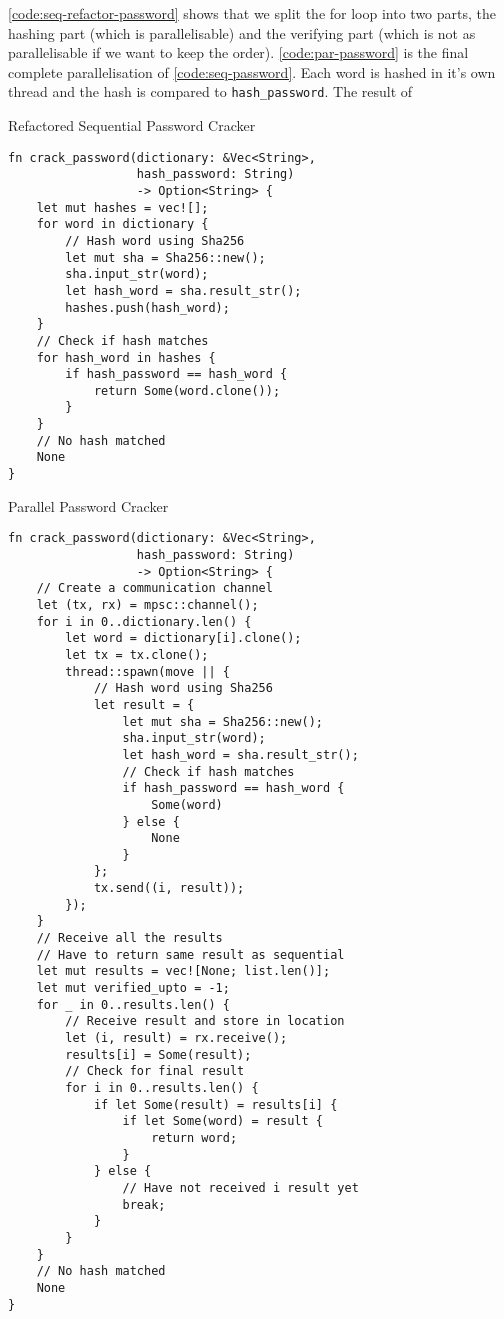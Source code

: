 \documentclass[conference]{IEEEtran}
\begin{document}
\autoref{code:seq-refactor-password} shows that we split the for loop into two parts, the hashing part (which is parallelisable) and the verifying part (which is not as parallelisable if we want to keep the order). \autoref{code:par-password} is the final complete parallelisation of \autoref{code:seq-password}. Each word is hashed in it's own thread and the hash is compared to \texttt{hash\_password}. The result of

\begin{algorithm}
\caption{Refactored Sequential Password Cracker}
\label{code:seq-refactor-password}
\begin{verbatim}
fn crack_password(dictionary: &Vec<String>,
                  hash_password: String)
                  -> Option<String> {
    let mut hashes = vec![];
    for word in dictionary {
        // Hash word using Sha256
        let mut sha = Sha256::new();
        sha.input_str(word);
        let hash_word = sha.result_str();
        hashes.push(hash_word);
    }
    // Check if hash matches
    for hash_word in hashes {
        if hash_password == hash_word {
            return Some(word.clone());
        }
    }
    // No hash matched
    None
}
\end{verbatim}
\end{algorithm}

\begin{algorithm}
\caption{Parallel Password Cracker}
\label{code:par-password}
\begin{verbatim}
fn crack_password(dictionary: &Vec<String>,
                  hash_password: String)
                  -> Option<String> {
    // Create a communication channel
    let (tx, rx) = mpsc::channel();
    for i in 0..dictionary.len() {
        let word = dictionary[i].clone();
        let tx = tx.clone();
        thread::spawn(move || {
            // Hash word using Sha256
            let result = {
                let mut sha = Sha256::new();
                sha.input_str(word);
                let hash_word = sha.result_str();
                // Check if hash matches
                if hash_password == hash_word {
                    Some(word)
                } else {
                    None
                }
            };
            tx.send((i, result));
        });
    }
    // Receive all the results
    // Have to return same result as sequential
    let mut results = vec![None; list.len()];
    let mut verified_upto = -1;
    for _ in 0..results.len() {
        // Receive result and store in location
        let (i, result) = rx.receive();
        results[i] = Some(result);
        // Check for final result
        for i in 0..results.len() {
            if let Some(result) = results[i] {
                if let Some(word) = result {
                    return word;
                }
            } else {
                // Have not received i result yet
                break;
            }
        }
    }
    // No hash matched
    None
}
\end{verbatim}
\end{algorithm}
\end{document}
